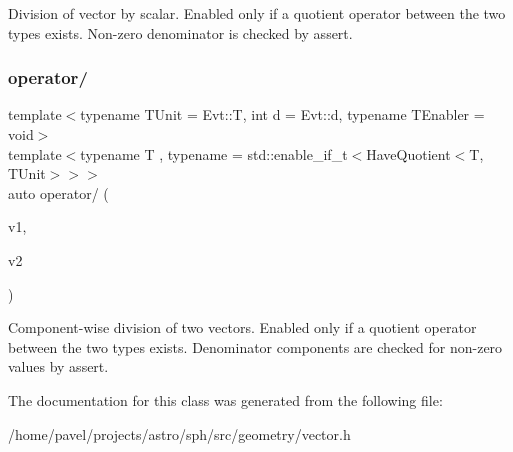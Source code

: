 Division of vector by scalar. Enabled only if a quotient operator between the two types exists. Non-\/zero denominator is checked by assert. \hypertarget{classVector_ada2ba21f8fde22223f85c7b017321d8b}{}\label{classVector_ada2ba21f8fde22223f85c7b017321d8b} 
\subsubsection{\texorpdfstring{operator/}{operator/}\hspace{0.1cm}{\footnotesize\ttfamily [2/2]}}
{\footnotesize\ttfamily template$<$typename T\+Unit = Evt\+::T, int d = Evt\+::d, typename T\+Enabler = void$>$ \\
template$<$typename T , typename  = std\+::enable\+\_\+if\+\_\+t$<$\+Have\+Quotient$<$\+T, T\+Unit$>$$>$$>$ \\
auto operator/ (\begin{DoxyParamCaption}\item[{const \hyperlink{classVector}{Vector}$<$ T\+Unit, d, T\+Enabler $>$ \&}]{v1,  }\item[{const \hyperlink{classVector}{Vector}$<$ T, d $>$ \&}]{v2 }\end{DoxyParamCaption})\hspace{0.3cm}{\ttfamily [friend]}}

Component-\/wise division of two vectors. Enabled only if a quotient operator between the two types exists. Denominator components are checked for non-\/zero values by assert. 

The documentation for this class was generated from the following file\+:\begin{DoxyCompactItemize}
\item 
/home/pavel/projects/astro/sph/src/geometry/vector.\+h\end{DoxyCompactItemize}
